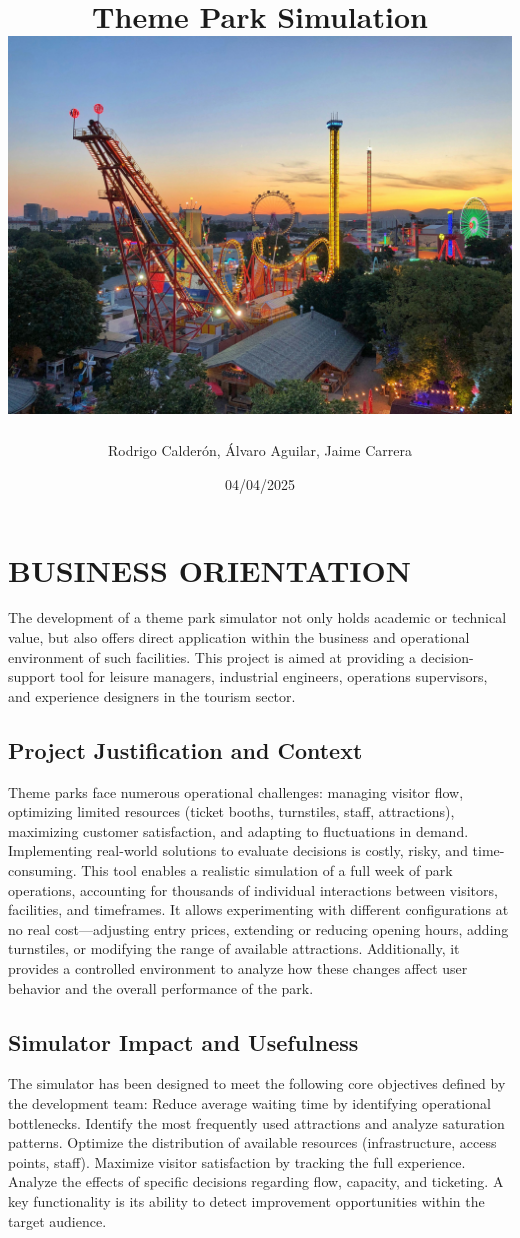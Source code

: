 \documentclass[12pt]{article}
\title{\Huge \textbf{Theme Park Simulation}\\[4cm]
\includegraphics[width=1\textwidth]{themepark.jpg} %
}
\author{Rodrigo Calderón, Álvaro Aguilar, Jaime Carrera}
\date{ 04/04/2025}
\begin{document}
\maketitle
\thispagestyle{empty}
\newpage
\tableofcontents
\newpage




\section{BUSINESS ORIENTATION}
The development of a theme park simulator not only holds academic or technical value, but also offers direct application within the business and operational environment of such facilities. This project is aimed at providing a decision-support tool for leisure managers, industrial engineers, operations supervisors, and experience designers in the tourism sector.
\subsection{Project Justification and Context}
Theme parks face numerous operational challenges: managing visitor flow, optimizing limited resources (ticket booths, turnstiles, staff, attractions), maximizing customer satisfaction, and adapting to fluctuations in demand. Implementing real-world solutions to evaluate decisions is costly, risky, and time-consuming.
This tool enables a realistic simulation of a full week of park operations, accounting for thousands of individual interactions between visitors, facilities, and timeframes. It allows experimenting with different configurations at no real cost—adjusting entry prices, extending or reducing opening hours, adding turnstiles, or modifying the range of available attractions. Additionally, it provides a controlled environment to analyze how these changes affect user behavior and the overall performance of the park.
\subsection{Simulator Impact and Usefulness}
The simulator has been designed to meet the following core objectives defined by the development team:
Reduce average waiting time by identifying operational bottlenecks.
Identify the most frequently used attractions and analyze saturation patterns.
Optimize the distribution of available resources (infrastructure, access points, staff).
Maximize visitor satisfaction by tracking the full experience.
Analyze the effects of specific decisions regarding flow, capacity, and ticketing.
A key functionality is its ability to detect improvement opportunities within the target audience.
\end{document}
